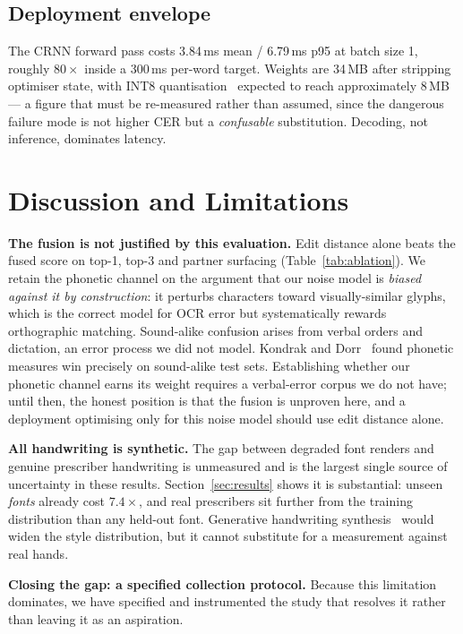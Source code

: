 \documentclass[conference]{IEEEtran}
\begin{document}
\subsection{Deployment envelope}
The CRNN forward pass costs 3.84\,ms mean / 6.79\,ms p95 at batch size 1,
roughly $80\times$ inside a 300\,ms per-word target. Weights are 34\,MB after
stripping optimiser state, with INT8 quantisation~\cite{jacob2018quantization}
expected to reach approximately 8\,MB --- a figure that must be re-measured
rather than assumed, since the dangerous failure mode is not higher CER but a
\emph{confusable} substitution. Decoding, not inference, dominates latency.

\section{Discussion and Limitations}\label{sec:discussion}

\textbf{The fusion is not justified by this evaluation.} Edit distance alone
beats the fused score on top-1, top-3 and partner surfacing
(Table~\ref{tab:ablation}). We retain the phonetic channel on the argument that
our noise model is \emph{biased against it by construction}: it perturbs
characters toward visually-similar glyphs, which is the correct model for OCR
error but systematically rewards orthographic matching. Sound-alike confusion
arises from verbal orders and dictation, an error process we did not
model. Kondrak and Dorr~\cite{kondrak2004identification} found phonetic
measures win precisely on sound-alike test sets. Establishing whether our
phonetic channel earns its weight requires a verbal-error corpus we do not have;
until then, the honest position is that the fusion is unproven here, and a
deployment optimising only for this noise model should use edit distance alone.

\textbf{All handwriting is synthetic.} The gap between degraded font renders and
genuine prescriber handwriting is unmeasured and is the largest single source of
uncertainty in these results. Section~\ref{sec:results} shows it is
substantial: unseen \emph{fonts} already cost $7.4\times$, and real prescribers
sit further from the training distribution than any held-out font. Generative
handwriting synthesis~\cite{fogel2020scrabblegan} would widen the style
distribution, but it cannot substitute for a measurement against real hands.

\textbf{Closing the gap: a specified collection protocol.} Because this
limitation dominates, we have specified and instrumented the study
that resolves it rather than leaving it as an aspiration.
\end{document}
